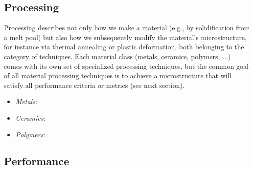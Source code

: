 \subsection{Processing}

Processing describes not only how we make a material (e.g., by solidification from a melt pool) but also how we subsequently modify the material's microstructure, for instance via thermal annealing or plastic deformation, both belonging to the category of  techniques.    Each material class (metals, ceramics, polymers, $\ldots$) comes with its own set of specialized processing techniques, but the common goal of all material processing techniques is to achieve a microstructure that will satisfy all performance criteria or metrics (see next section).  

\begin{itemize}
	\item \textit{Metals}: 

	\item \textit{Ceramics}: 

	\item \textit{Polymers}: 
\end{itemize}




\subsection{Performance}

